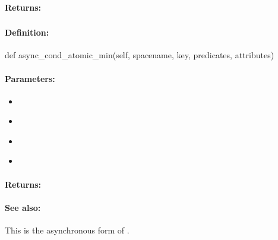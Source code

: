 \paragraph{Returns:}


\pagebreak
\subsubsection{}
\label{api:python:async_cond_atomic_min}


\paragraph{Definition:}
\begin{pythoncode}
def async_cond_atomic_min(self, spacename, key, predicates, attributes)
\end{pythoncode}

\paragraph{Parameters:}
\begin{itemize}[noitemsep]
\item {}\\

\item {}\\

\item {}\\

\item {}\\

\end{itemize}

\paragraph{Returns:}


\paragraph{See also:}  This is the asynchronous form of .

